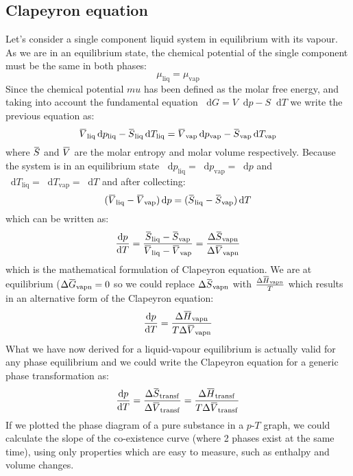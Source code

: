 \documentclass[12pt,a4paper]{report}
\newcommand*\diff{\mathop{}\!\mathrm{d}}
\newcommand{\overbar}[1]{\mkern 1.5mu\overline{\mkern-1.5mu#1\mkern-1.5mu}\mkern 1.5mu}
\begin{document}
   \subsection*{Clapeyron equation}
   Let's consider a single component liquid system in equilibrium with its vapour. As we are in an equilibrium state, the chemical potential of the single component must be the same in both phases:
   \begin{equation*}
   \mu_{\mathrm{liq}}=\mu_{\mathrm{vap}}
   \end{equation*}
   Since the chemical potential $mu$ has been defined as the molar free energy, and taking into account the fundamental equation $\diff G= V \diff p-S \diff T$ we write the previous equation as:
   \begin{equation*}
   \overbar{V}_{\mathrm{liq}}\diff p_{\mathrm{liq}} - \overbar{S}_{\mathrm{liq}} \diff T_{\mathrm{liq}} = \overbar{V}_{\mathrm{vap}}\diff p_{\mathrm{vap}} - \overbar{S}_{\mathrm{vap}} \diff T_{\mathrm{vap}} 
   \end{equation*}
   where $\overbar{S}$ and $\overbar{V}$ are the molar entropy and molar volume respectively.
   Because the system is in an equilibrium state $\diff p_{\mathrm{liq}}=\diff p_{\mathrm{vap}} = \diff p$ and $\diff T_{\mathrm{liq}}=\diff T_{\mathrm{vap}} = \diff T$
   and after collecting:
   \begin{equation*}
   (\overbar{V}_{\mathrm{liq}}-\overbar{V}_{\mathrm{vap}}) \diff p = (\overbar{S}_{\mathrm{liq}}-\overbar{S}_{\mathrm{vap}})\diff T
   \end{equation*}
   which can be written as:
   \begin{equation*}
   \frac{\diff p}{\diff T}= \frac{\overbar{S}_{\mathrm{liq}}-\overbar{S}_{\mathrm{vap}}}{\overbar{V}_{\mathrm{liq}}-\overbar{V}_{\mathrm{vap}}}= \frac{\Delta \overbar{S}_{\mathrm{vapn}}}{\Delta \overbar{V}_{\mathrm{vapn}}}
   \end{equation*}
   which is the mathematical formulation of Clapeyron equation. We are at equilibrium ($\Delta \overbar{G}_{\mathrm{vapn}} = 0$ so we could replace $\Delta \overbar{S}_{\mathrm{vapn}}$ with $\frac{\Delta \overbar{H}_{\mathrm{vapn}}}{T}$ which results in an alternative form of the Clapeyron equation:
   \begin{equation*}
   \frac{\diff p}{\diff T}=  \frac{\Delta \overbar{H}_{\mathrm{vapn}}}{T \Delta \overbar{V}_{\mathrm{vapn}}}
   \end{equation*}
   What we have now derived for a liquid-vapour equilibrium is actually valid for any phase equilibrium and we could write the Clapeyron equation for a generic phase transformation as:
   \begin{equation*}
   \frac{\diff p}{\diff T}=\frac{\Delta \overbar{S}_{\mathrm{transf}}}{\Delta \overbar{V}_{\mathrm{transf}}} = \frac{\Delta \overbar{H}_{\mathrm{transf}}}{T \Delta \overbar{V}_{\mathrm{transf}}}
   \end{equation*}
   If we plotted the phase diagram of a pure substance in a $p$-$T$ graph, we could calculate the slope of the co-existence curve (where 2 phases exist at the same time), using only properties which are easy to measure, such as enthalpy and volume changes.
\end{document}
